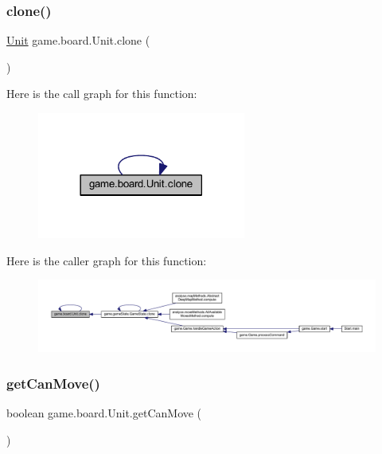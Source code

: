 \subsubsection{\texorpdfstring{clone()}{clone()}}
{\footnotesize\ttfamily \mbox{\hyperlink{classgame_1_1board_1_1_unit}{Unit}} game.\+board.\+Unit.\+clone (\begin{DoxyParamCaption}{ }\end{DoxyParamCaption})\hspace{0.3cm}{\ttfamily [inline]}}

Here is the call graph for this function\+:
\nopagebreak
\begin{figure}[H]
\begin{center}
\leavevmode
\includegraphics[width=194pt]{classgame_1_1board_1_1_unit_ad4f3140a22fc3d4dfb3ecaede3e15d8b_cgraph}
\end{center}
\end{figure}
Here is the caller graph for this function\+:
\nopagebreak
\begin{figure}[H]
\begin{center}
\leavevmode
\includegraphics[width=350pt]{classgame_1_1board_1_1_unit_ad4f3140a22fc3d4dfb3ecaede3e15d8b_icgraph}
\end{center}
\end{figure}
\mbox{\label{classgame_1_1board_1_1_unit_ae0c9711da7c05804afe511b537b3c27a}} 
\subsubsection{\texorpdfstring{get\+Can\+Move()}{getCanMove()}}
{\footnotesize\ttfamily boolean game.\+board.\+Unit.\+get\+Can\+Move (\begin{DoxyParamCaption}{ }\end{DoxyParamCaption})\hspace{0.3cm}{\ttfamily [inline]}}

